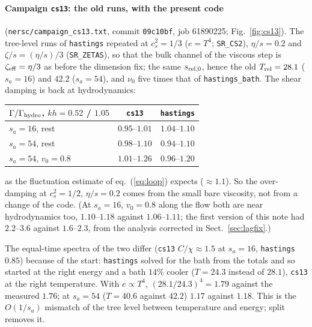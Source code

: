\documentclass[11pt,aps,preprint,nofootinbib,superscriptaddress,tightenlines]{revtex4-2}
\def\Eq#1{eq.~(\ref{#1})}
\def\Sect#1{Sect.~\ref{#1}}
\def\Fig#1{Fig.~\ref{#1}}
\let\oldparagraph\paragraph
\renewcommand{\paragraph}{\par\bigskip\oldparagraph}
\begin{document}
\paragraph{Campaign \texttt{cs13}: the old runs, with the present code} (\texttt{nersc/campaign\_cs13.txt}, commit \texttt{09c10bf}, job
61890225; \Fig{fig:cs13}).  The tree-level runs of \texttt{hastings} repeated at $c_s^2=1/3$ ($e=T^4$; \texttt{SR\_CS2}), $\eta/s=0.2$ and
$\zeta/s=(\eta/s)/3$ (\texttt{SR\_ZETAS}), so that the bulk channel of the viscous step is $\zeta_{\rm eff}=\eta/3$ as before the dimension
fix; the same $s_{\rm rel,0}$, hence the old $T_{\rm rel}=28.1$ ($s_a=16$) and $42.2$ ($s_a=54$), and $\nu_0$ five times that of
\texttt{hastings\_bath}.  The shear damping is back at hydrodynamics:
\begin{center}
\begin{tabular}{lcc}
\toprule
$\Gamma/\Gamma_{\rm hydro}$, $kh=0.52$ / $1.05$ & \texttt{cs13} & \texttt{hastings} \\ \midrule
$s_a=16$, rest & $0.95$--$1.01$ & $1.04$--$1.10$ \\
$s_a=54$, rest & $0.98$--$1.10$ & $0.94$--$1.10$ \\
$s_a=54$, $v_0=0.8$ & $1.01$--$1.26$ & $0.96$--$1.20$ \\
\bottomrule
\end{tabular}
\end{center}
as the fluctuation estimate of \Eq{eq:loop} expects ($\approx1.1$).  So the over-damping at $c_s^2=1/2$, $\eta/s=0.2$ comes from the
small bare viscosity, not from a change of the code.  (At $s_a=16$, $v_0=0.8$ along the flow both are near hydrodynamics too, $1.10$--$1.18$ against $1.06$--$1.11$; the first version of this
note had $2.2$--$3.6$ against $1.6$--$2.3$, from the analysis corrected in \Sect{sec:lagfix}.)

The equal-time spectra of the two differ (\texttt{cs13} $C/\chi\approx1.5$ at $s_a=16$, \texttt{hastings} $0.85$) because of the start:
\texttt{hastings} solved for the bath from the totals and so started at the right energy and a bath $14\%$ cooler ($T=24.3$ instead of
$28.1$), \texttt{cs13} at the right temperature.  With $e\propto T^4$, $(28.1/24.3)^4=1.79$ against the measured $1.76$; at $s_a=54$
($T=40.6$ against $42.2$) $1.17$ against $1.18$.  This is the $O(1/s_a)$ mismatch of the tree level between temperature and energy;
split removes it.
\end{document}
